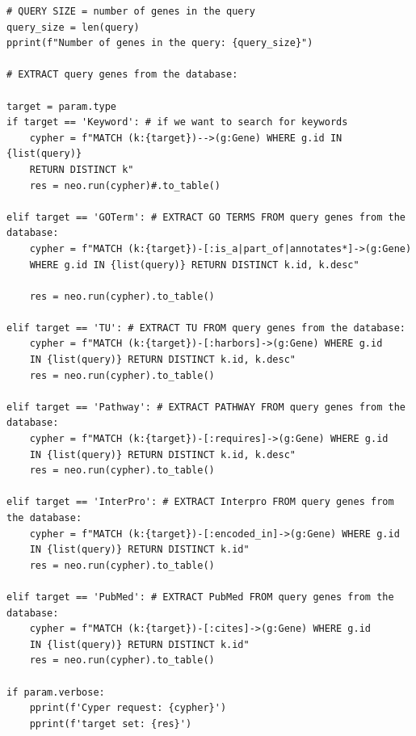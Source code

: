 \documentclass[a4paper,11pt,openright]{report}
\begin{document}
\begin{verbatim}
# QUERY SIZE = number of genes in the query
query_size = len(query)
pprint(f"Number of genes in the query: {query_size}")

# EXTRACT query genes from the database:

target = param.type
if target == 'Keyword': # if we want to search for keywords
    cypher = f"MATCH (k:{target})-->(g:Gene) WHERE g.id IN {list(query)} 
    RETURN DISTINCT k"
    res = neo.run(cypher)#.to_table()

elif target == 'GOTerm': # EXTRACT GO TERMS FROM query genes from the database:
    cypher = f"MATCH (k:{target})-[:is_a|part_of|annotates*]->(g:Gene) 
    WHERE g.id IN {list(query)} RETURN DISTINCT k.id, k.desc" 
    
    res = neo.run(cypher).to_table()

elif target == 'TU': # EXTRACT TU FROM query genes from the database:
    cypher = f"MATCH (k:{target})-[:harbors]->(g:Gene) WHERE g.id 
    IN {list(query)} RETURN DISTINCT k.id, k.desc" 
    res = neo.run(cypher).to_table()

elif target == 'Pathway': # EXTRACT PATHWAY FROM query genes from the database:
    cypher = f"MATCH (k:{target})-[:requires]->(g:Gene) WHERE g.id 
    IN {list(query)} RETURN DISTINCT k.id, k.desc" 
    res = neo.run(cypher).to_table()

elif target == 'InterPro': # EXTRACT Interpro FROM query genes from the database:
    cypher = f"MATCH (k:{target})-[:encoded_in]->(g:Gene) WHERE g.id 
    IN {list(query)} RETURN DISTINCT k.id" 
    res = neo.run(cypher).to_table()

elif target == 'PubMed': # EXTRACT PubMed FROM query genes from the database:
    cypher = f"MATCH (k:{target})-[:cites]->(g:Gene) WHERE g.id 
    IN {list(query)} RETURN DISTINCT k.id" 
    res = neo.run(cypher).to_table()

if param.verbose:
    pprint(f'Cyper request: {cypher}')
    pprint(f'target set: {res}')



\end{verbatim}
\end{document}
